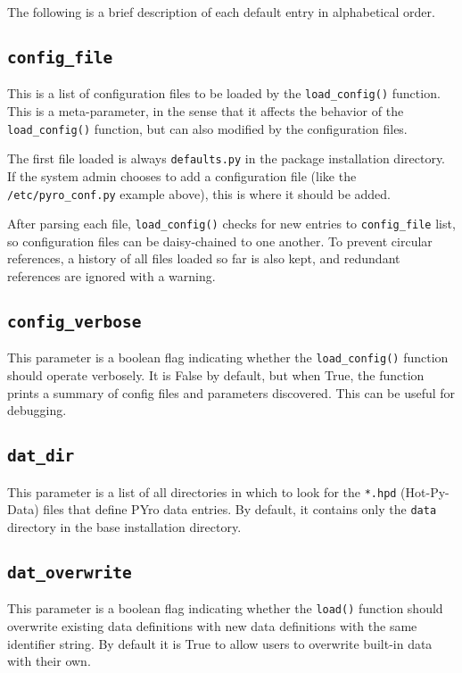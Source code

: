 The following is a brief description of each default entry in alphabetical order.

\subsection{\texttt{config\_file}}
This is a list of configuration files to be loaded by the \verb|load_config()| function.  This is a meta-parameter, in the sense that it affects the behavior of the \verb|load_config()| function, but can also modified by the configuration files.

The first file loaded is always \verb|defaults.py| in the package installation directory.  If the system admin chooses to add a configuration file (like the \verb|/etc/pyro_conf.py| example above), this is where it should be added.

After parsing each file, \verb|load_config()| checks for new entries to \verb|config_file| list, so configuration files can be daisy-chained to one another.  To prevent circular references, a history of all files loaded so far is also kept, and redundant references are ignored with a warning.

\subsection{\texttt{config\_verbose}}
This parameter is a boolean flag indicating whether the \verb|load_config()| function should operate verbosely.  It is False by default, but when True, the function prints a summary of config files and parameters discovered.  This can be useful for debugging.

\subsection{\texttt{dat\_dir}}
This parameter is a list of all directories in which to look for the \verb|*.hpd| (Hot-Py-Data) files that define PYro data entries.  By default, it contains only the \verb|data| directory in the base installation directory.

\subsection{\texttt{dat\_overwrite}}
This parameter is a boolean flag indicating whether the \verb|load()| function should overwrite existing data definitions with new data definitions with the same identifier string.  By default it is True to allow users to overwrite built-in data with their own.

